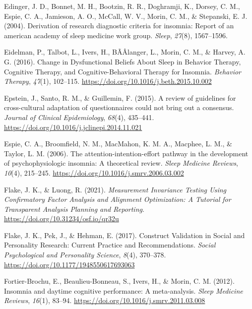 \documentclass[
  ,doc,11pt, twoside,floatsintext]{apa6}
\newlength{\cslhangindent}
\newlength{\cslentryspacingunit} %
\newenvironment{CSLReferences}[2] %
 {%
  \setlength{\parindent}{0pt}
  \ifodd #1
  \let\oldpar\par
  \def\par{\hangindent=\cslhangindent\oldpar}
  \fi
  \setlength{\parskip}{#2\cslentryspacingunit}
 }%
 {}
\begin{document}
\begin{CSLReferences}{1}{0}
\leavevmode{}%
Edinger, J. D., Bonnet, M. H., Bootzin, R. R., Doghramji, K., Dorsey, C. M., Espie, C. A., Jamieson, A. O., McCall, W. V., Morin, C. M., \& Stepanski, E. J. (2004). Derivation of research diagnostic criteria for insomnia: Report of an american academy of sleep medicine work group. \emph{Sleep}, \emph{27}(8), 1567--1596.

\leavevmode{}%
Eidelman, P., Talbot, L., Ivers, H., BÃÂlanger, L., Morin, C. M., \& Harvey, A. G. (2016). Change in {Dysfunctional Beliefs About Sleep} in {Behavior Therapy}, {Cognitive Therapy}, and {Cognitive-Behavioral Therapy} for {Insomnia}. \emph{Behavior Therapy}, \emph{47}(1), 102--115. \url{https://doi.org/10.1016/j.beth.2015.10.002}

\leavevmode{}%
Epstein, J., Santo, R. M., \& Guillemin, F. (2015). A review of guidelines for cross-cultural adaptation of questionnaires could not bring out a consensus. \emph{Journal of Clinical Epidemiology}, \emph{68}(4), 435--441. \url{https://doi.org/10.1016/j.jclinepi.2014.11.021}

\leavevmode{}%
Espie, C. A., Broomfield, N. M., MacMahon, K. M. A., Macphee, L. M., \& Taylor, L. M. (2006). The attention-intention-effort pathway in the development of psychophysiologic insomnia: A theoretical review. \emph{Sleep Medicine Reviews}, \emph{10}(4), 215--245. \url{https://doi.org/10.1016/j.smrv.2006.03.002}

\leavevmode{}%
Flake, J. K., \& Luong, R. (2021). \emph{Measurement {Invariance Testing Using Confirmatory Factor Analysis} and {Alignment Optimization}: {A Tutorial} for {Transparent Analysis Planning} and {Reporting}}. \url{https://doi.org/10.31234/osf.io/qr32u}

\leavevmode{}%
Flake, J. K., Pek, J., \& Hehman, E. (2017). Construct {Validation} in {Social} and {Personality Research}: {Current Practice} and {Recommendations}. \emph{Social Psychological and Personality Science}, \emph{8}(4), 370--378. \url{https://doi.org/10.1177/1948550617693063}

\leavevmode{}%
Fortier-Brochu, E., Beaulieu-Bonneau, S., Ivers, H., \& Morin, C. M. (2012). Insomnia and daytime cognitive performance: A meta-analysis. \emph{Sleep Medicine Reviews}, \emph{16}(1), 83--94. \url{https://doi.org/10.1016/j.smrv.2011.03.008}


\end{CSLReferences}
\end{document}
